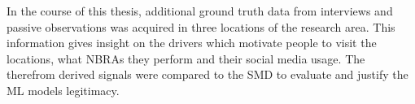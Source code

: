 \newline
In the course of this thesis, additional ground truth data from interviews and passive observations was acquired in three locations of the research area. This information gives insight on the drivers which motivate people to visit the locations, what NBRAs they perform and their social media usage. The therefrom derived signals were compared to the SMD \parencite{Wartmann2018} to evaluate and justify the ML models legitimacy. 
